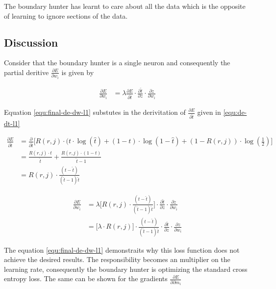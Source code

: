 \documentclass[notitlepage]{report}
\theoremstyle{definition}
\begin{document}
The boundary hunter has learnt to care about all the data which is the opposite of learning to ignore sections of the data.

\subsection{Discussion}
Consider that the boundary hunter is a single neuron and consequently the partial deritive $\frac{\partial E}{\partial w_i}$ is given by

\begin{align}
\frac{\partial E}{\partial w_i} &= \lambda \frac{\partial E}{\partial \widehat{t}} \cdot \frac{\partial \widehat{t}}{\partial z} \cdot \frac{\partial z}{\partial w_i}
\end{align}

Equation \ref{equ:final-de-dw-l1} substutes in the derivitation of $\frac{\partial E}{\partial \widehat{t}}$ given in \ref{equ:de-dt-l1} 

\begin{equation}
\begin{aligned}
\frac{\partial E}{\partial \widehat{t}} &= \frac{\partial}{\partial \widehat{t}} \big[ R(r, j) \cdot (t \cdot \log(\widehat{t}) + (1-t)\cdot \log(1 - \widehat{t}) + (1-R(r,j)) \cdot \log(\frac{1}{2}) \big]\\
&= \frac{R(r, j) \cdot t}{\widehat{t}} + \frac{R(r, j) \cdot (1 - t)}{\widehat{t} - 1}\\
&= R(r, j) \cdot \frac{(t - \widehat{t})}{(\widehat{t} - 1) \widehat{t}}
\label{equ:de-dt-l1}
\end{aligned}
\end{equation}

\begin{equation}
\begin{aligned}
\frac{\partial E}{\partial w_i} &= \lambda \big[ R(r, j) \cdot \frac{(t - \widehat{t})}{(\widehat{t} - 1) \widehat{t}} \big] \cdot \frac{\partial \widehat{t}}{\partial z} \cdot \frac{\partial z}{\partial w_i}\\
&= \big[\lambda \cdot R(r,j) \big] \cdot \frac{(t - \widehat{t})}{(\widehat{t} - 1) \widehat{t}} \cdot \frac{\partial \widehat{t}}{\partial z} \cdot \frac{\partial z}{\partial w_i}
\label{equ:final-de-dw-l1}
\end{aligned}
\end{equation}

The equation \ref{equ:final-de-dw-l1} demonstraits why this loss function does not achieve the desired results. The responsibility becomes an multiplier on the learning rate, consequently the boundary hunter is optimizing the standard cross entropy loss. The same can be shown for the gradients $\frac{\partial E}{\partial \partial m_i}$
\end{document}
